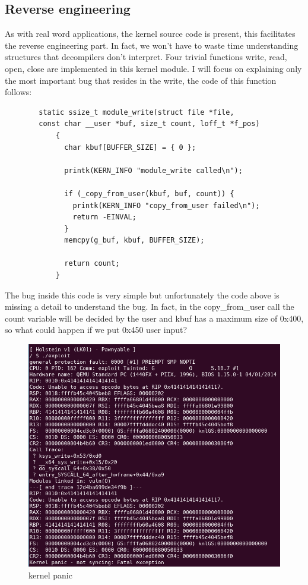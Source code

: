    \subsection{Reverse engineering}
    As with real word applications, the kernel source code is present, this facilitates the reverse engineering part.\newline
    In fact, we won't have to waste time understanding structures that decompilers don't interpret.\newline
    Four trivial functions write, read, open, close are implemented in this kernel module.\newline
    I will focus on explaining only the most important bug that resides in the write, the code of this function follows:\newline
    \clearpage
    \begin{verbatim}
        static ssize_t module_write(struct file *file,
        const char __user *buf, size_t count, loff_t *f_pos)
            {
              char kbuf[BUFFER_SIZE] = { 0 };
            
              printk(KERN_INFO "module_write called\n");
            
              if (_copy_from_user(kbuf, buf, count)) {
                printk(KERN_INFO "copy_from_user failed\n");
                return -EINVAL;
              }
              memcpy(g_buf, kbuf, BUFFER_SIZE);
            
              return count;
            }
    \end{verbatim}
    The bug inside this code is very simple but unfortunately the code above is missing a detail to understand the bug.\newline
    In fact, in the copy\_from\_user call the count variable will be decided by the user and kbuf has a maximum size of 0x400, so what could happen if we put 0x450 user input?\newline
    \begin{figure}[htbp]
        \centering
        \includegraphics[width=1\linewidth]{Images/kernel_panic.png}
        \caption{kernel panic}
        \label{fig:enter-label}
    \end{figure}

